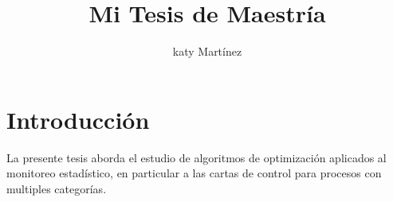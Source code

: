 \documentclass{report}
\begin{document}
\title{Mi Tesis de Maestría}
\author{katy Martínez}
\maketitle

\chapter{Introducción}

La presente tesis aborda el estudio de algoritmos de optimización aplicados al monitoreo estadístico, en particular a las cartas de control para procesos con multiples categorías. 
\end{document}
